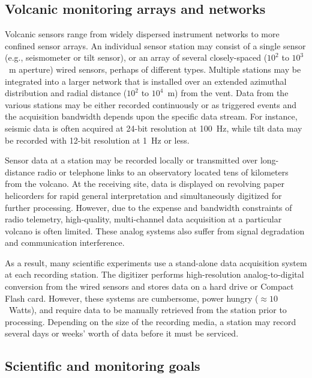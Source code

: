\subsection{Volcanic monitoring arrays and networks}

Volcanic sensors range from widely dispersed instrument networks to more
confined sensor arrays. An individual sensor station may consist of a
single sensor (e.g., seismometer or tilt sensor), or an array of several
closely-spaced ($10^2$ to $10^3$~m aperture) wired sensors, perhaps
of different types. Multiple stations may be integrated into a larger
network that is installed over an extended azimuthal distribution and
radial distance ($10^2$ to $10^4$~m) from the vent.  Data from the various
stations may be either recorded continuously or as triggered events and
the acquisition bandwidth depends upon the specific data stream. For
instance, seismic data is often acquired at 24-bit resolution at 100~Hz,
while tilt data may be recorded with 12-bit resolution at 1~Hz or less.

Sensor data at a station may be recorded locally or transmitted over
long-distance radio or telephone links to an observatory
located tens of kilometers from the volcano.  At the receiving site,
data is displayed on revolving paper helicorders for rapid general
interpretation and simultaneously digitized for further processing.
However, due to the expense and bandwidth constraints of radio telemetry,
high-quality, multi-channel data acquisition at a particular volcano is
often limited. These analog systems also suffer from signal degradation
and communication interference.

As a result, many scientific experiments use a stand-alone data
acquisition system at each recording station. 
The digitizer performs high-resolution 
analog-to-digital conversion from the wired sensors and stores data 
on a hard drive or Compact Flash card. However, these systems are
cumbersome, power hungry ($\approx
10$~Watts), and require data to be manually retrieved from the station
prior to processing. Depending on the size of the recording media,
a station may record several days or weeks' worth of data before
it must be serviced.

\subsection{Scientific and monitoring goals}


